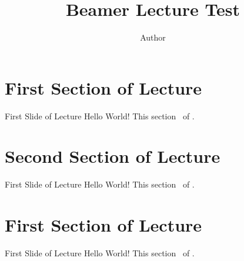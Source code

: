 \documentclass[
	aspectratio=169, %
	8pt, %
]{beamer}
\title{Beamer Lecture Test}
\author{Author}
\begin{document}
    \maketitle



    \maketitle

    \contentoverview

    \section{First Section of Lecture \thelecture}

    \begin{frame}{First Slide of Lecture \thelecture}
        Hello World! This section \thesection\ of \insertlecture.
    \end{frame}

    \section{Second Section of Lecture \thelecture}

    \begin{frame}{First Slide of Lecture \thelecture}
        Hello World! This section \thesection\ of \insertlecture.
    \end{frame}




    \maketitle

    \contentoverview

    \section{First Section of Lecture \thelecture}

    \begin{frame}{First Slide of Lecture \thelecture}
        Hello World! This section \thesection\ of \insertlecture.
    \end{frame}
\end{document}
